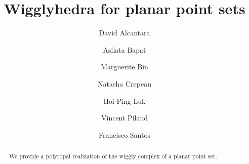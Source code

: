 \documentclass{amsart}
\title{Wigglyhedra for planar point sets}
\author[D. Alcantara]{David Alcantara}
\author[A. Bapat]{Asilata Bapat}
\author[M. Bin]{Marguerite Bin}
\author[N. Crepeau]{Natasha Crepeau}
\author[H. Ping Luk]{Hoi Ping Luk}
\author[V. Pilaud]{Vincent Pilaud}
\author[F. Santos]{Francisco Santos}
\theoremstyle{definition}
\newtheorem{definition}[theorem]{Definition}
\newcommand{\darkblue}{\color{darkblue}} %
\newcommand{\defn}[1]{\textsl{\darkblue #1}} %
\newcommand{\vincent}[1]{\todo[size=\scriptsize, color=blue!30]{\rm #1 \\ \hfill --- V.}}
\newcommand{\extendedWigglyComplex}{\mathrm{WC}} %
\newcommand{\wigglyFlipGraph}{\mathrm{WFG}} %
\begin{document}
\begin{abstract}
We provide a polytopal realization of the wiggly complex of a planar point set.
\end{abstract}

\maketitle

\tableofcontents


%
%
%
\end{document}
